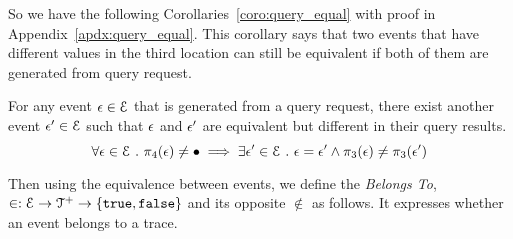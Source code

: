 So we have the following Corollaries~\ref{coro:query_equal} with proof in Appendix~\ref{apdx:query_equal}.
This corollary says that two events that have different values 
in the third location can still be equivalent if both of them are generated from query request.
\begin{coro}
 \label{coro:query_equal}
 For any event $\mathtt{\epsilon} \in \mathcal{E}$ that is generated from a query request, 
 there exist another event $\mathtt{\epsilon}' \in \mathcal{E}$ 
 such that 
 $\mathtt{\epsilon}$ and $\mathtt{\epsilon}'$ are equivalent but different in their query results.
 \[
 \forall \mathtt{\epsilon} \in \mathcal{E} ~.~ 
 \pi_4(\mathtt{\epsilon}) \neq \bullet
 \implies \exists 
 \mathtt{\epsilon}' \in \mathcal{E} ~.~ 
 \mathtt{\epsilon} = \mathtt{\epsilon}' \land \pi_3(\mathtt{\epsilon}) \neq \pi_3(\mathtt{\epsilon}')
 \]
 \end{coro}

 


Then using the equivalence between events, we
define the \emph{Belongs To}, 
 $\in : \mathcal{E} \to \mathcal{T}^{+} \to \{\mathtt{true}, \mathtt{false} \} $
 and its opposite $\not\in$ as follows.
It expresses whether an event belongs to a trace.

